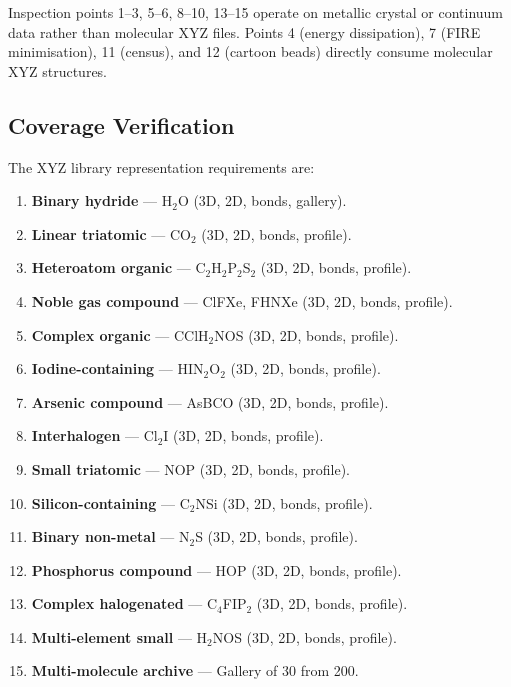\documentclass[11pt,a4paper]{article}
\begin{document}
\noindent Inspection points 1--3, 5--6, 8--10, 13--15 operate on
metallic crystal or continuum data rather than molecular XYZ files.
Points 4 (energy dissipation), 7 (FIRE minimisation), 11 (census), and
12 (cartoon beads) directly consume molecular XYZ structures.

\subsection{Coverage Verification}

The XYZ library representation requirements are:

\begin{enumerate}[label=(\roman*)]
  \item \textbf{Binary hydride} --- H$_2$O (3D, 2D, bonds, gallery). \checkmark
  \item \textbf{Linear triatomic} --- CO$_2$ (3D, 2D, bonds, profile). \checkmark
  \item \textbf{Heteroatom organic} --- C$_2$H$_2$P$_2$S$_2$ (3D, 2D, bonds, profile). \checkmark
  \item \textbf{Noble gas compound} --- ClFXe, FHNXe (3D, 2D, bonds, profile). \checkmark
  \item \textbf{Complex organic} --- CClH$_2$NOS (3D, 2D, bonds, profile). \checkmark
  \item \textbf{Iodine-containing} --- HIN$_2$O$_2$ (3D, 2D, bonds, profile). \checkmark
  \item \textbf{Arsenic compound} --- AsBCO (3D, 2D, bonds, profile). \checkmark
  \item \textbf{Interhalogen} --- Cl$_2$I (3D, 2D, bonds, profile). \checkmark
  \item \textbf{Small triatomic} --- NOP (3D, 2D, bonds, profile). \checkmark
  \item \textbf{Silicon-containing} --- C$_2$NSi (3D, 2D, bonds, profile). \checkmark
  \item \textbf{Binary non-metal} --- N$_2$S (3D, 2D, bonds, profile). \checkmark
  \item \textbf{Phosphorus compound} --- HOP (3D, 2D, bonds, profile). \checkmark
  \item \textbf{Complex halogenated} --- C$_4$FIP$_2$ (3D, 2D, bonds, profile). \checkmark
  \item \textbf{Multi-element small} --- H$_2$NOS (3D, 2D, bonds, profile). \checkmark
  \item \textbf{Multi-molecule archive} --- Gallery of 30 from 200. \checkmark
\end{enumerate}
\end{document}

